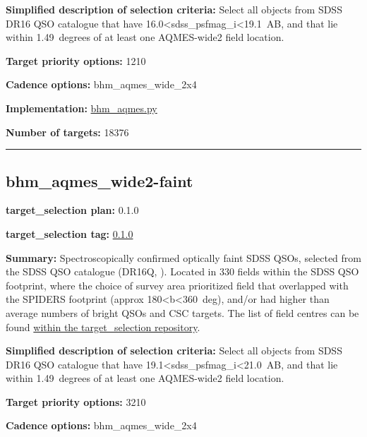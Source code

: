\noindent\textbf{Simplified description of selection criteria:} Select all
objects from SDSS DR16 QSO catalogue that have
16.0\textless sdss\_psfmag\_i\textless19.1~AB, and that lie within
1.49~degrees of at least one AQMES-wide2 field location.


\noindent\textbf{Target priority options:} 1210

\noindent\textbf{Cadence options:} bhm\_aqmes\_wide\_2x4

\noindent\textbf{Implementation:}
\href{https://github.com/sdss/target_selection/blob/0.1.0/python/target_selection/cartons/bhm_aqmes.py}{bhm\_aqmes.py}

\noindent\textbf{Number of targets:} 18376

\begin{center}\rule{0.5\linewidth}{0.5pt}\end{center}

\hypertarget{bhm_aqmes_wide2-faint_plan0.1.0}{%
\subsection{bhm\_aqmes\_wide2-faint}\label{bhm_aqmes_wide2-faint_plan0.1.0}}

\noindent\textbf{target\_selection plan:} 0.1.0

\noindent\textbf{target\_selection tag:}
\href{https://github.com/sdss/target_selection/tree/0.1.0/}{0.1.0}

\noindent\textbf{Summary:} Spectroscopically confirmed optically faint SDSS QSOs,
selected from the SDSS QSO catalogue (DR16Q,
\citealt{Lyke2020}). Located in 330 fields within the SDSS QSO footprint,
where the choice of survey area prioritized field that overlapped with
the SPIDERS footprint (approx 180\textless b\textless360~deg), and/or
had higher than average numbers of bright QSOs and CSC targets. The list
of field centres can be found
\href{https://github.com/sdss/target_selection/blob/0.1.0/python/target_selection/masks/candidate_target_fields_bhm_aqmes_wide_v0.2.1.fits}{within
the target\_selection repository}.

\noindent\textbf{Simplified description of selection criteria:} Select all
objects from SDSS DR16 QSO catalogue that have
19.1\textless sdss\_psfmag\_i\textless21.0~AB, and that lie within
1.49~degrees of at least one AQMES-wide2 field location.


\noindent\textbf{Target priority options:} 3210

\noindent\textbf{Cadence options:} bhm\_aqmes\_wide\_2x4

